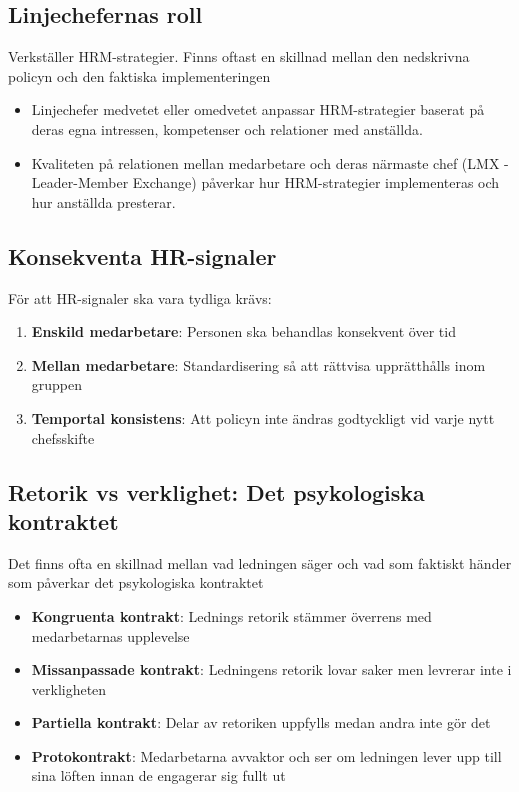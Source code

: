 \documentclass[12pt,a4paper]{article}
\begin{document}
\subsection{Linjechefernas roll}
Verkställer HRM-strategier. Finns oftast en skillnad mellan den nedskrivna policyn och den faktiska implementeringen
\begin{itemize}
    \item Linjechefer medvetet eller omedvetet anpassar HRM-strategier baserat på deras egna intressen, kompetenser och relationer med anställda.
    \item Kvaliteten på relationen mellan medarbetare och deras närmaste chef (LMX - Leader-Member Exchange) påverkar hur HRM-strategier implementeras och hur anställda presterar.
\end{itemize}

\subsection{Konsekventa HR-signaler}
För att HR-signaler ska vara tydliga krävs:
\begin{enumerate}
    \item \textbf{Enskild medarbetare}: Personen ska behandlas konsekvent över tid
    \item \textbf{Mellan medarbetare}: Standardisering så att rättvisa upprätthålls inom gruppen
    \item \textbf{Temportal konsistens}: Att policyn inte ändras godtyckligt vid varje nytt chefsskifte
\end{enumerate}

\subsection{Retorik vs verklighet: Det psykologiska kontraktet}
Det finns ofta en skillnad mellan vad ledningen säger och vad som faktiskt händer som påverkar det psykologiska kontraktet
\begin{itemize}
    \item \textbf{Kongruenta kontrakt}: Lednings retorik stämmer överrens med medarbetarnas upplevelse
    \item \textbf{Missanpassade kontrakt}: Ledningens retorik lovar saker men levrerar inte i verkligheten
    \item \textbf{Partiella kontrakt}: Delar av retoriken uppfylls medan andra inte gör det
    \item \textbf{Protokontrakt}: Medarbetarna avvaktor och ser om ledningen lever upp till sina löften innan de engagerar sig fullt ut
\end{itemize}
\end{document}
